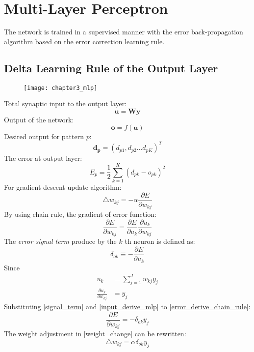 \chapter{Multi-Layer Perceptron}
The network is trained in a supervised manner with the error back-propagation algorithm based on the error correction learning rule. 

\section{Delta Learning Rule of the Output Layer}
\begin{figure}[h]
\centering
\texttt{[image: chapter3\_mlp]}
\end{figure}
\noindent Total synaptic input to the output layer:
$$\mathbf{u = Wy}$$
Output of the network:
$$\mathbf{o} = f(\mathbf{u})$$
Desired output for pattern $p$:
$$\mathbf{d_p}=(d_{p1}, d_{p2} \ldots d_{pK})^{T}$$
The error at output layer:
$$E_p=\frac{1}{2}\sum_{k=1}^{K}(d_{pk}-o_{pk})^2$$
For gradient descent update algorithm:
\begin{equation}
\triangle w_{kj} = - \alpha \frac{\partial E}{\partial w_{kj}}
\label{weight_change}
\end{equation}
By using chain rule, the gradient of error function:
\begin{equation}
\frac{\partial E}{\partial w_{kj}} = \frac{\partial E}{\partial u_k} \frac{\partial u_k}{\partial w_{kj}}
\label{error_derive_chain_rule}
\end{equation}
The \emph{error signal term} produce by the $k$ th neuron is defined as:
\begin{equation}
\delta_{ok} \equiv - \frac{\partial E}{\partial u_k}
\label{signal_term}
\end{equation}
Since
\begin{equation}
\begin{split}
u_k &= \sum_{j=1}^{J} w_{kj} y_j\\
\frac{\partial u_k}{\partial w_{kj}} &= y_j
\end{split}
\label{input_derive_mlp}
\end{equation}
Substituting \ref{signal_term} and \ref{input_derive_mlp} to \ref{error_derive_chain_rule}:
\begin{equation}
\frac{\partial E}{\partial w_{kj}} = - \delta_{ok} y_j
\label{error_derive_2}
\end{equation}
The weight adjustment in \ref{weight_change} can be rewritten:
\begin{equation}
\triangle w_{kj} = \alpha \delta_{ok} y_j
\label{weight_change_2}
\end{equation}
